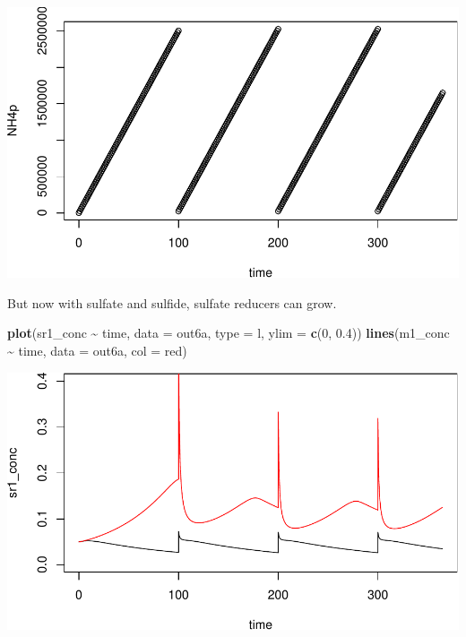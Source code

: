 \documentclass[
]{article}
\newenvironment{Shaded}{\begin{snugshade}}{\end{snugshade}}
\newcommand{\AttributeTok}[1]{\textcolor[rgb]{0.13,0.29,0.53}{#1}}
\newcommand{\DecValTok}[1]{\textcolor[rgb]{0.00,0.00,0.81}{#1}}
\newcommand{\FloatTok}[1]{\textcolor[rgb]{0.00,0.00,0.81}{#1}}
\newcommand{\FunctionTok}[1]{\textcolor[rgb]{0.13,0.29,0.53}{\textbf{#1}}}
\newcommand{\NormalTok}[1]{#1}
\newcommand{\SpecialCharTok}[1]{\textcolor[rgb]{0.81,0.36,0.00}{\textbf{#1}}}
\newcommand{\StringTok}[1]{\textcolor[rgb]{0.31,0.60,0.02}{#1}}
\begin{document}
\includegraphics{simple_demo_files/figure-latex/unnamed-chunk-40-2.pdf}

But now with sulfate and sulfide, sulfate reducers can grow.

\begin{Shaded}
\begin{Highlighting}[]
\FunctionTok{plot}\NormalTok{(sr1\_conc }\SpecialCharTok{\textasciitilde{}}\NormalTok{ time, }\AttributeTok{data =}\NormalTok{ out6a, }\AttributeTok{type =} \StringTok{\textquotesingle{}l\textquotesingle{}}\NormalTok{, }\AttributeTok{ylim =} \FunctionTok{c}\NormalTok{(}\DecValTok{0}\NormalTok{, }\FloatTok{0.4}\NormalTok{))}
\FunctionTok{lines}\NormalTok{(m1\_conc }\SpecialCharTok{\textasciitilde{}}\NormalTok{ time, }\AttributeTok{data =}\NormalTok{ out6a, }\AttributeTok{col =} \StringTok{\textquotesingle{}red\textquotesingle{}}\NormalTok{)}
\end{Highlighting}
\end{Shaded}

\includegraphics{simple_demo_files/figure-latex/unnamed-chunk-41-1.pdf}
\end{document}
